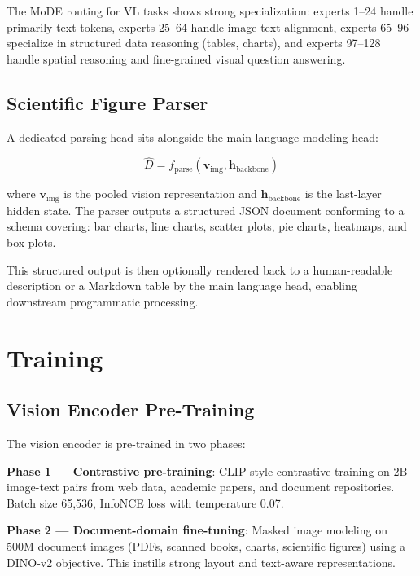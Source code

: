 \documentclass[11pt,a4paper]{article}
\begin{document}
The MoDE routing for VL tasks shows strong specialization: experts 1--24 handle
primarily text tokens, experts 25--64 handle image-text alignment, experts 65--96
specialize in structured data reasoning (tables, charts), and experts 97--128
handle spatial reasoning and fine-grained visual question answering.

\subsection{Scientific Figure Parser}

A dedicated parsing head sits alongside the main language modeling head:

\begin{equation}
\hat{D} = f_{\text{parse}}(\mathbf{v}_{\text{img}}, \mathbf{h}_{\text{backbone}})
\end{equation}

where $\mathbf{v}_{\text{img}}$ is the pooled vision representation and
$\mathbf{h}_{\text{backbone}}$ is the last-layer hidden state. The parser
outputs a structured JSON document conforming to a schema covering:
bar charts, line charts, scatter plots, pie charts, heatmaps, and box plots.

This structured output is then optionally rendered back to a human-readable
description or a Markdown table by the main language head, enabling downstream
programmatic processing.

\section{Training}
\label{sec:training}

\subsection{Vision Encoder Pre-Training}

The vision encoder is pre-trained in two phases:

\textbf{Phase 1 --- Contrastive pre-training}: CLIP-style contrastive training on
2B image-text pairs from web data, academic papers, and document repositories.
Batch size 65,536, InfoNCE loss with temperature 0.07.

\textbf{Phase 2 --- Document-domain fine-tuning}: Masked image modeling on 500M
document images (PDFs, scanned books, charts, scientific figures) using a DINO-v2
objective. This instills strong layout and text-aware representations.
\end{document}
